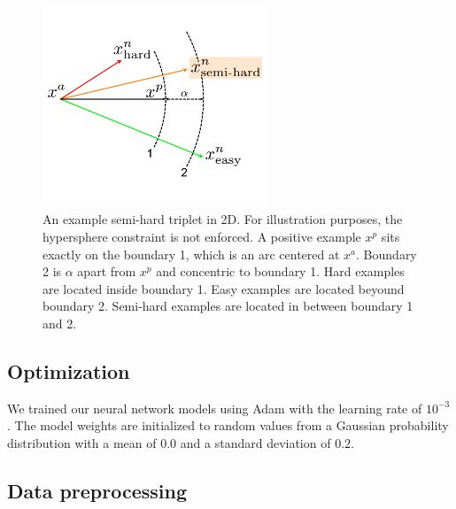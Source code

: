 \begin{figure} 
\includegraphics[width=0.6\textwidth,keepaspectratio]
{./figures/triplet_difficulty_level.pdf} 

\caption{An example semi-hard triplet in 2D.  For illustration purposes, the
hypersphere constraint is not enforced.  A positive example $x^p$ sits exactly
on the boundary 1, which is an arc centered at $x^a$. Boundary 2 is $\alpha$
apart from $x^p$ and concentric to boundary 1.  Hard examples are located inside
boundary 1.  Easy examples are located beyound boundary 2. Semi-hard examples
are located in between boundary 1 and 2.  } 

\label{fig: semi-hard} 
\end{figure}


\subsection{Optimization}


We trained our neural network models using Adam
\cite{kingmaAdamMethodStochastic2017} with the learning rate of $10^{-3}$.  The
model weights are initialized to random values from a Gaussian probability
distribution with a mean of $0.0$ and a standard deviation of $0.2$.  

\subsection{Data preprocessing}

